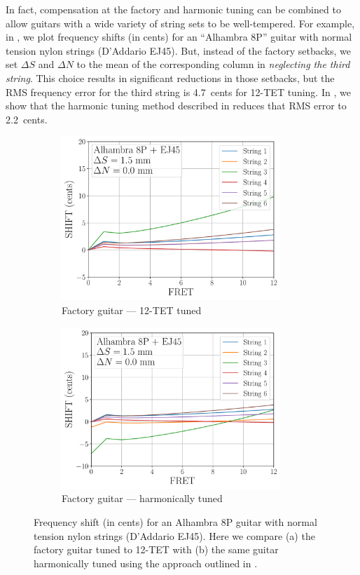 In fact, compensation at the factory and harmonic tuning can be combined to allow guitars with a wide variety of string sets to be well-tempered. For example, in , we plot frequency shifts (in cents) for an ``Alhambra 8P'' guitar with normal tension nylon strings (D'Addario EJ45). But, instead of the factory setbacks, we set $\Delta S$ and $\Delta N$ to the mean of the corresponding column in  \emph{neglecting the third string}. This choice results in significant reductions in those setbacks, but the RMS frequency error for the third string is 4.7~cents for 12-TET tuning. In , we show that the harmonic tuning method described in  reduces that RMS error to 2.2~cents.

 \begin{figure}
  \centering
  \begin{subfigure}[b]{0.45\textwidth}
   \centering
   \includegraphics[width=3.25in]{figures/shift_alhambra8p_ej45_factory}
   \caption{Factory guitar --- 12-TET tuned}
   \label{fig:shift_alhambra8p_ej45_fact_temp}
  \end{subfigure}
  \hspace{0.25in}
  \begin{subfigure}[b]{0.45\textwidth}
   \centering
   \includegraphics[width=3.25in]{figures/shift_alhambra8p_ej45_harmonic}
   \caption{Factory guitar --- harmonically tuned}
   \label{fig:shift_alhambra8p_ej45_harmonic}
  \end{subfigure}
  \caption{\label{fig:compensation_alhambra8p_ej45_temp} Frequency shift (in cents) for an Alhambra 8P guitar with normal tension nylon strings (D'Addario EJ45). Here we compare (a) the factory guitar tuned to 12-TET with (b) the same guitar harmonically tuned using the approach outlined in .}
 \end{figure}

